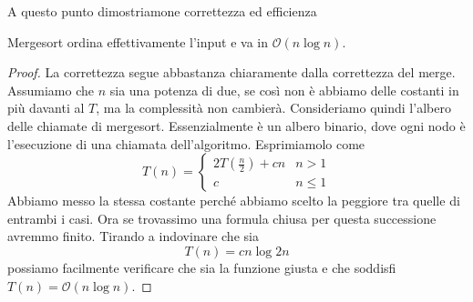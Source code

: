 \documentclass[11pt]{scrartcl}
\newcommand{\bigo}{\mathcal{O}}
\begin{document}
	A questo punto dimostriamone correttezza ed efficienza
	\begin{lemma}
		Mergesort ordina effettivamente l'input e va in $\bigo(n\log n)$.
	\end{lemma}
	\begin{proof}
		La correttezza segue abbastanza chiaramente dalla correttezza del merge. Assumiamo che $n$ sia una potenza di due, se così non è abbiamo delle costanti in più davanti al $T$, ma la complessità non cambierà. Consideriamo quindi l'albero delle chiamate di mergesort. Essenzialmente è un albero binario, dove ogni nodo è l'esecuzione di una chiamata dell'algoritmo. Esprimiamolo come
		$$T(n)=
		\begin{cases}
			2T(\frac{n}{2})+cn & n>1 \\
			c & n\le 1
		\end{cases}
		$$
		Abbiamo messo la stessa costante perché abbiamo scelto la peggiore tra quelle di entrambi i casi. Ora se trovassimo una formula chiusa per questa successione avremmo finito. Tirando a indovinare che sia 
		$$T(n)=cn\log{2n}$$
		possiamo facilmente verificare che sia la funzione giusta e che soddisfi $T(n)=\bigo(n\log n)$.
	\end{proof}
\end{document}
